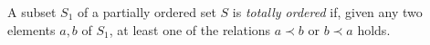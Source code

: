 A subset $S_1$ of a partially ordered set $S$ is \textit{totally ordered} if, given any two elements $a, b$ of $S_1$, at least one of the relations $a \prec b$ or $b \prec a$ holds.
